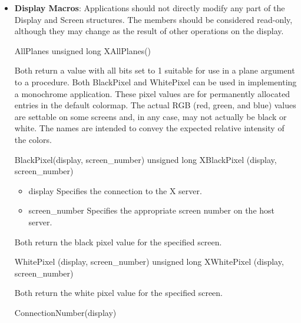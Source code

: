 \documentclass{report}
\begin{document}
\begin{itemize}
\begin{itemize}
                \item DirectColor
            \end{itemize}
            \bigbreak \noindent 
            A \texttt{Visual*} is an Xlib object describing one supported color interpretation scheme.
        \item \textbf{Display Macros}: Applications should not directly modify any part of the Display and Screen structures. The members should be considered read-only, although they may change as the result of other operations on the display.
            \bigbreak \noindent 
            \begin{cppcode}
            AllPlanes
            unsigned long XAllPlanes()
            \end{cppcode}
            \bigbreak \noindent 
            Both return a value with all bits set to 1 suitable for use in a plane argument to a procedure. 
            \bigbreak \noindent 
            Both BlackPixel and WhitePixel can be used in implementing a monochrome application. These pixel values are for permanently allocated entries in the default colormap. The actual RGB (red, green, and blue) values are settable on some screens and, in any case, may not actually be black or white. The names are intended to convey the expected relative intensity of the colors.
            \begin{cppcode}
            BlackPixel(display, screen_number) 
            unsigned long XBlackPixel (display, screen_number)
            \end{cppcode}
            \bigbreak \noindent
            \begin{itemize}
                \item display Specifies the connection to the X server.
                \item screen\_number Specifies the appropriate screen number on the host server.
            \end{itemize}
            Both return the black pixel value for the specified screen.
            \bigbreak \noindent 
            \begin{cppcode}
                WhitePixel (display, screen_number)
                unsigned long XWhitePixel (display, screen_number)
            \end{cppcode}
            \bigbreak \noindent 
            Both return the white pixel value for the specified screen.
            \bigbreak \noindent 
            \begin{cppcode}
            ConnectionNumber(display)

\end{cppcode}
\end{itemize}
\end{document}
